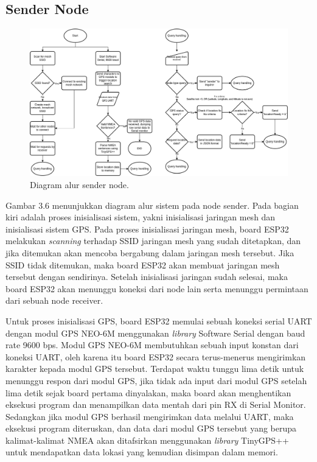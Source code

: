 \subsection{Sender Node}
\begin{figure}[H]
	\centering
	\includegraphics[scale=0.35]{./assets/FlowchartSenderNew}
	\caption{Diagram alur sender node.}
\end{figure}
Gambar 3.6 menunjukkan diagram alur sistem pada node sender. Pada bagian kiri adalah proses inisialisasi sistem, yakni inisialisasi jaringan mesh dan inisialisasi sistem GPS. Pada proses inisialisasi jaringan mesh, board ESP32 melakukan \textit{scanning} terhadap SSID jaringan mesh yang sudah ditetapkan, dan jika ditemukan akan mencoba bergabung dalam jaringan mesh tersebut. Jika SSID tidak ditemukan, maka board ESP32 akan membuat jaringan mesh tersebut dengan sendirinya. Setelah inisialisasi jaringan sudah selesai, maka board ESP32 akan menunggu koneksi dari node lain serta menunggu permintaan dari sebuah node receiver.

Untuk proses inisialisasi GPS, board ESP32 memulai sebuah koneksi serial UART dengan modul GPS NEO-6M menggunakan \textit{library} Software Serial dengan baud rate 9600 bps. Modul GPS NEO-6M membutuhkan sebuah input konstan dari koneksi UART, oleh karena itu board ESP32 secara terus-menerus mengirimkan karakter kepada modul GPS tersebut. Terdapat waktu tunggu lima detik untuk menunggu respon dari modul GPS, jika tidak ada input dari modul GPS setelah lima detik sejak board pertama dinyalakan, maka board akan menghentikan eksekusi program dan menampilkan data mentah dari pin RX di Serial Monitor. Sedangkan jika modul GPS berhasil mengirimkan data melalui UART, maka eksekusi program diteruskan, dan data dari modul GPS tersebut yang berupa kalimat-kalimat NMEA akan ditafsirkan menggunakan \textit{library} TinyGPS++ untuk mendapatkan data lokasi yang kemudian disimpan dalam memori.

